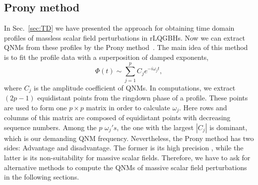 \documentclass[12pt]{article}
\begin{document}
\subsection{Prony method}\label{sec:prony}
In Sec.~\ref{sec:TD} we have presented the approach for obtaining time domain profiles of massless scalar field perturbations in rLQGBHs. Now we can extract QNMs from these profiles by the Prony method~\cite{Konoplya:2011qq,Berti:2007dg}.     
The main idea of this method is to fit the profile data with a superposition of damped exponents,
\begin{equation}\label{eq:prony}
    \Phi(t)\sim \sum_{j=1}^p C_j e^{-i\omega_jt},
\end{equation}
where $C_j$ is the amplitude coefficient of QNMs. In computations, we extract $(2p-1)$ equidistant points from the ringdown phase of a profile. 
These points are used to form one $p\times p$ matrix in order to calculate $\omega_j$. 
Here rows and columns of this matrix are composed of equidistant points with decreasing sequence numbers.
Among the $p$ $\omega_j's$, the one with the largest $|C_j|$ is dominant, which is our demanding QNM frequency.
Nevertheless, the Prony method has two sides: Advantage and disadvantage. The former is its high precision \cite{zhang2020object}, while the latter is its non-suitability for massive scalar fields. %
Therefore, we have to ask for alternative methods to compute the QNMs of massive scalar field perturbations in the following sections.

 

    
\end{document}

